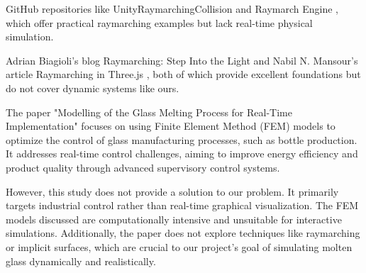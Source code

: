 \documentclass{rapportcs}
\begin{document}
    GitHub repositories like UnityRaymarchingCollision \cite{hecomi_raymarching_2024} and Raymarch Engine \cite{koskimies_raymarching_2024}, which offer practical raymarching examples but lack real-time physical simulation.

    Adrian Biagioli's blog \cite{biagioli_raymarching_2024} Raymarching: Step Into the Light and Nabil N. Mansour's article Raymarching in Three.js \cite{mansour_sdf_2024}, both of which provide excellent foundations but do not cover dynamic systems like ours.

    The paper "Modelling of the Glass Melting Process for Real-Time Implementation" \cite{agh_university_of_science_and_technology_in_krakow_30-059_krakow_mickiewicza_av_30_poland_modelling_2015} focuses on using Finite Element Method (FEM) models to optimize the control of glass manufacturing processes, such as bottle production. It addresses real-time control challenges, aiming to improve energy efficiency and product quality through advanced supervisory control systems.

    However, this study does not provide a solution to our problem. It primarily targets industrial control rather than real-time graphical visualization. The FEM models discussed are computationally intensive and unsuitable for interactive simulations. Additionally, the paper does not explore techniques like raymarching or implicit surfaces, which are crucial to our project’s goal of simulating molten glass dynamically and realistically.

    \newpage

    \newpage
\end{document}
